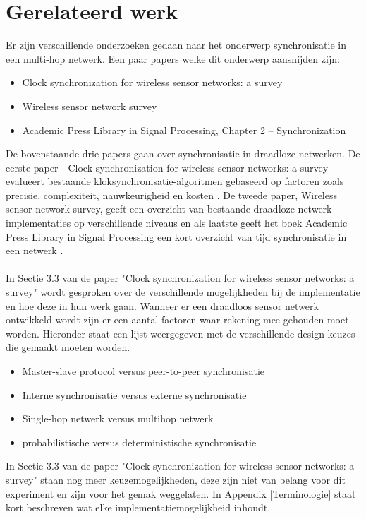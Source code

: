 \documentclass{article}
\begin{document}
\section{Gerelateerd werk}
Er zijn verschillende onderzoeken gedaan naar het onderwerp synchronisatie in een multi-hop netwerk. 
Een paar papers welke dit onderwerp aansnijden zijn: 
\begin{itemize}
	\item Clock synchronization for wireless sensor networks: a survey
	\item Wireless sensor network survey
	\item Academic Press Library in Signal Processing, Chapter 2 – Synchronization
\end{itemize}
De bovenstaande drie papers gaan over synchronisatie in draadloze netwerken. De eerste paper - Clock synchronization for wireless sensor networks: a survey - evalueert bestaande kloksynchronisatie-algoritmen gebaseerd op factoren zoals precisie, complexiteit, nauwkeurigheid en kosten \cite{survey}. De tweede paper, Wireless sensor network survey, geeft een overzicht van bestaande draadloze netwerk implementaties op verschillende niveaus \cite{survey2} en als laatste geeft het boek Academic Press Library in Signal Processing een kort overzicht van tijd synchronisatie in een netwerk \cite{academic}. \\
\\
In Sectie 3.3 van de paper "Clock synchronization for wireless sensor networks: a survey" wordt gesproken over de verschillende mogelijkheden bij de implementatie en hoe deze in hun werk gaan. 
Wanneer er een draadloos sensor netwerk ontwikkeld wordt zijn er een aantal factoren waar rekening mee gehouden moet worden. Hieronder staat een lijst weergegeven met de verschillende design-keuzes die gemaakt moeten worden.
\begin{itemize}
	\item Master-slave protocol versus peer-to-peer synchronisatie
	\item Interne synchronisatie versus externe synchronisatie
	\item Single-hop netwerk versus multihop netwerk
	\item probabilistische versus deterministische synchronisatie
\end{itemize}
In Sectie 3.3 van de paper "Clock synchronization for wireless sensor networks: a survey" staan nog meer keuzemogelijkheden, deze zijn niet van belang voor dit experiment en zijn voor het gemak weggelaten. 
In Appendix \ref{Terminologie} staat kort beschreven wat elke implementatiemogelijkheid inhoudt.\\
\end{document}
